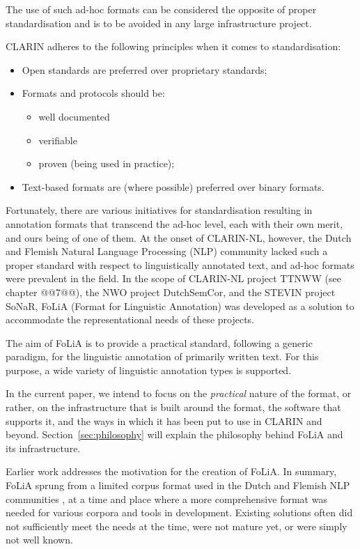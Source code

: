 \documentclass[a4paper,11pt]{article}
\begin{document}
The use of such ad-hoc formats can be considered the opposite of proper
standardisation and is to be avoided in any large infrastructure project.

CLARIN adheres to the following principles when it comes to standardisation:

\begin{itemize}
    \item Open standards are preferred over proprietary standards;
    \item Formats and protocols should be:
    \begin{itemize}
        \item well documented
        \item verifiable
        \item proven (being used in practice);
    \end{itemize}
    \item Text-based formats are (where possible) preferred over binary formats.
\end{itemize}

Fortunately, there are various initiatives for standardisation resulting in
annotation formats that transcend the ad-hoc level, each with their own merit, and ours
being of one of them. At the onset of CLARIN-NL, however, the Dutch and Flemish
Natural Language Processing (NLP) community lacked such a proper standard with
respect to linguistically annotated text, and ad-hoc formats were prevalent in
the field.  In the scope of CLARIN-NL project TTNWW (see chapter @@7@@), the NWO project
DutchSemCor, and the STEVIN project SoNaR, FoLiA (Format for Linguistic
Annotation) was developed as a solution to accommodate the representational
needs of these projects.

The aim of FoLiA is to provide a practical standard, following a generic
paradigm, for the linguistic annotation of primarily written text. For this purpose,
a wide variety of linguistic annotation types is supported.

In the current paper, we intend to focus on the \emph{practical} nature of the format, or rather, on the infrastructure
that is built around the format, the software that supports it, and the ways in which it has been put to use in CLARIN
and beyond.  Section~\ref{sec:philosophy} will explain the philosophy behind FoLiA and its infrastructure.

Earlier work \cite{FOLIACLIN2013} addresses the motivation for the creation of
FoLiA. In summary, FoLiA sprung from a limited corpus format used in the Dutch
and Flemish NLP communities \cite{DCOI}, at a time and place where a more
comprehensive format was needed for various corpora and tools in development.
Existing solutions often did not sufficiently meet the needs at the time, were
not mature yet, or were simply not well known.
\end{document}
